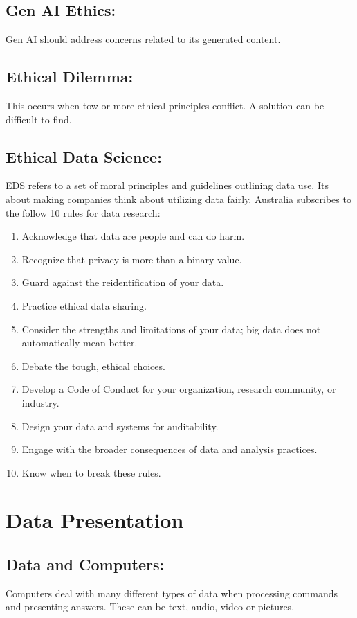 \documentclass[a5paper]{article}
\begin{document}
	\subsection{Gen AI Ethics:}
	Gen AI should address concerns related to its generated content.
	\subsection{Ethical Dilemma:}
	This occurs when tow or more ethical principles conflict. A solution can be difficult to find.
	\subsection{Ethical Data Science:}
	EDS refers to a set of moral principles and guidelines outlining data use. Its about making companies think about utilizing data fairly. Australia subscribes to the follow 10 rules for data research:
	\begin{enumerate}
		\item Acknowledge that data are people and can do harm.
		\item Recognize that privacy is more than a binary value.
		\item Guard against the reidentification of your data.
		\item Practice ethical data sharing.
		\item Consider the strengths and limitations of your data; big data does not automatically mean better.
		\item Debate the tough, ethical choices.
		\item Develop a Code of Conduct for your organization, research community, or industry.
		\item Design your data and systems for auditability.
		\item Engage with the broader consequences of data and analysis practices.
		\item Know when to break these rules.
	\end{enumerate}

	\section{Data Presentation}
	\subsection{Data and Computers:}
	Computers deal with many different types of data when processing commands and presenting answers. These can be text, audio, video or pictures.
\end{document}
